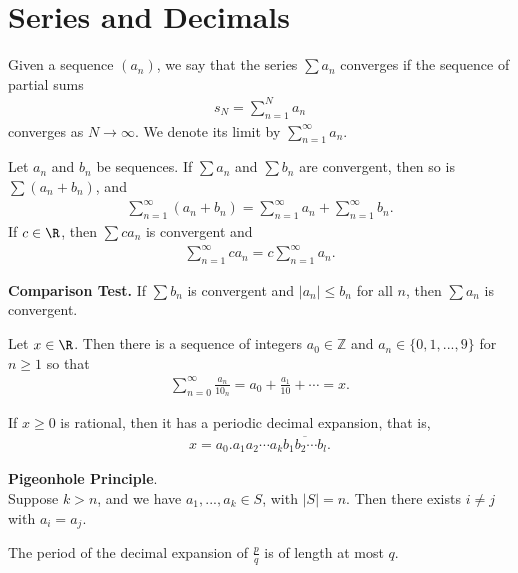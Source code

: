 \documentclass{article}
\begin{document}
\section{Series and Decimals}
\begin{definition}
	Given a sequence $(a_n)$, we say that the series $\sum a_n$ converges if the sequence of partial sums
	\begin{align*}
		s_N=\sum_{n=1}^N a_n
	\end{align*}
	converges as $N\to\infty$. We denote its limit by $\sum_{n=1}^\infty a_n$.
\end{definition}
\begin{theorem}
	Let $a_n$ and $b_n$ be sequences. If $\sum a_n$ and $\sum b_n$ are convergent, then so is $\sum (a_n+b_n)$, and
	\begin{align*}
		\sum_{n=1}^\infty (a_n+b_n) = \sum_{n=1}^\infty a_n+ \sum_{n=1}^\infty b_n.
	\end{align*}
	If $c\in\R$, then $\sum ca_n$ is convergent and
	\begin{align*}
		\sum_{n=1}^\infty ca_n = c\sum_{n=1}^\infty a_n.
	\end{align*}
\end{theorem}
\begin{theorem}
	\textbf{Comparison Test.} If $\sum b_n$ is convergent and $|a_n|\leq b_n$ for all $n$, then $\sum a_n$ is convergent.
\end{theorem}
\begin{theorem}
	Let $x\in\R$. Then there is a sequence of integers $a_0\in\mathbb{Z}$ and $a_n\in\{0,1,...,9\}$ for $n\geq 1$ so that
	\begin{align*}
		\sum_{n=0}^\infty \frac{a_n}{10_n}=a_0+\frac{a_1}{10}+\cdots = x.
	\end{align*}
\end{theorem}
\begin{theorem}
	If $x\geq 0$ is rational, then it has a periodic decimal expansion, that is,
	\begin{align*}
		x=a_0.a_1a_2\cdots a_k\overline{b_1b_2\cdots b_l}.
	\end{align*}
\end{theorem}
\begin{definition}
	\textbf{Pigeonhole Principle}.\\
	Suppose $k>n$, and we have $a_1,...,a_k\in S$, with $|S|=n$. Then there exists $i\not=j$ with $a_i=a_j$.
\end{definition}
\begin{theorem}
	The period of the decimal expansion of $\frac{p}{q}$ is of length at most $q$.
\end{theorem}
\end{document}
